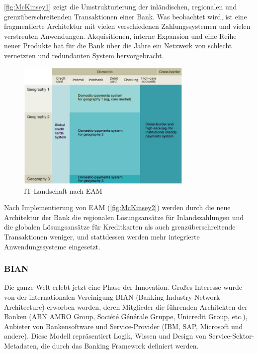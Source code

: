 \documentclass[
	doc,
	a4paper,
	helv
	]{apa6}
\begin{document}
\autoref{fig:McKinsey1} zeigt die Umstrukturierung der inländischen, regionalen und grenzüberschreitenden Transaktionen einer Bank. Was beobachtet wird, ist eine fragmentierte Architektur mit vielen verschiedenen Zahlungssystemen und vielen verstreuten Anwendungen. Akquisitionen, interne Expansion und eine Reihe neuer Produkte hat für die Bank über die Jahre ein Netzwerk von schlecht vernetzten und redundanten System hervorgebracht.


\begin{figure}[!htbp]
\begin{center}
\includegraphics[width=0.75\textwidth]{Abbildungen/McKinsey2.png}
\caption{IT-Landschaft nach EAM \autocite{McKinsey}}
\label{fig:McKinsey2}
\end{center}
\end{figure}

Nach Implementierung von EAM (\autoref{fig:McKinsey2}) werden durch die neue Architektur der Bank die regionalen Lösungsansätze für Inlandszahlungen und die globalen Lösungsansätze für Kreditkarten als auch grenzüberschreitende Transaktionen weniger, und  stattdessen werden mehr integrierte Anwendungssysteme eingesetzt.

\subsubsection{BIAN}

Die ganze Welt erlebt jetzt eine Phase der Innovation. Großes Interesse wurde von der internationalen Vereinigung BIAN (Banking Industry Network Architecture) erworben worden, deren Mitglieder die führenden Architekten der Banken (ABN AMRO Group, Société Générale Gruppe, Unicredit Group, etc.), Anbieter von Bankensoftware und Service-Provider (IBM, SAP, Microsoft und andere). Diese Modell repräsentiert Logik, Wissen und Design von Service-Sektor-Metadaten, die durch das Banking Framework definiert werden.
 
\end{document}
